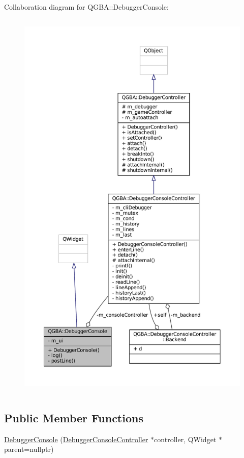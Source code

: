 Collaboration diagram for Q\+G\+BA\+:\+:Debugger\+Console\+:
\nopagebreak
\begin{figure}[H]
\begin{center}
\leavevmode
\includegraphics[height=550pt]{class_q_g_b_a_1_1_debugger_console__coll__graph}
\end{center}
\end{figure}
\subsection*{Public Member Functions}
\begin{DoxyCompactItemize}
\item 
\mbox{\hyperlink{class_q_g_b_a_1_1_debugger_console_a2a21572e0ebb866fbffac35f3832794a}{Debugger\+Console}} (\mbox{\hyperlink{class_q_g_b_a_1_1_debugger_console_controller}{Debugger\+Console\+Controller}} $\ast$controller, Q\+Widget $\ast$parent=nullptr)
\end{DoxyCompactItemize}
